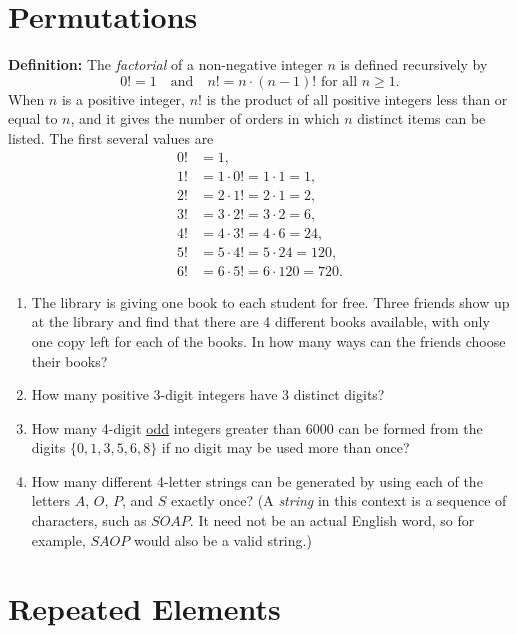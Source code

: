 \documentclass{article}
\begin{document}
\section*{Permutations}

\textbf{Definition:} The \emph{factorial} of a non-negative integer $n$ is defined recursively by
\begin{equation*}
0! = 1\quad\text{and}\quad n! = n\cdot (n - 1)!\text{ for all }n\geq 1.
\end{equation*}
When $n$ is a positive integer, $n!$ is the product of all positive integers less than or equal to $n$, and it gives the number of orders in which $n$ distinct items can be listed. The first several values are
\begin{align*}
0! &= 1, \\
1! &= 1\cdot 0! = 1\cdot 1 = 1, \\
2! &= 2\cdot 1! = 2\cdot 1 = 2, \\
3! &= 3\cdot 2! = 3\cdot 2 = 6, \\
4! &= 4\cdot 3! = 4\cdot 6 = 24, \\
5! &= 5\cdot 4! = 5\cdot 24 = 120, \\
6! &= 6\cdot 5! = 6\cdot 120 = 720.
\end{align*}
\begin{enumerate}
\item The library is giving one book to each student for free. Three friends show up at the library and find that there are 4 different books available, with only one copy left for each of the books. In how many ways can the friends choose their books?\vspace{2cm}
\item How many positive 3-digit integers have 3 distinct digits?\vspace{2cm}
\item How many 4-digit \underline{odd} integers greater than 6000 can be formed from the digits $\{0, 1, 3, 5, 6, 8\}$ if no digit may be used more than once?\vspace{2cm}
\item How many different 4-letter strings can be generated by using each of the letters $A$, $O$, $P$, and $S$ exactly once? (A \emph{string} in this context is a sequence of characters, such as $SOAP$. It need not be an actual English word, so for example, $SAOP$ would also be a valid string.)
\end{enumerate} 


\newpage

\section*{Repeated Elements}
\end{document}
